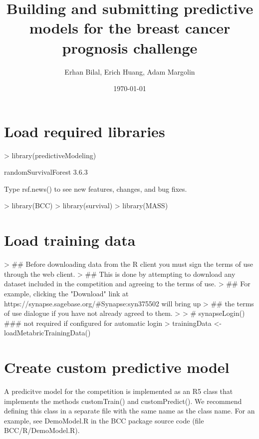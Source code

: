 \documentclass[10pt]{article}
\title{Building and submitting predictive models for the breast cancer prognosis challenge}
\author{Erhan Bilal, Erich Huang, Adam Margolin}
\date{\today}
\begin{document}


\maketitle

\section{Load required libraries}
\begin{Schunk}
\begin{Sinput}
> library(predictiveModeling)
\end{Sinput}
\begin{Soutput}
randomSurvivalForest 3.6.3

Type rsf.news() to see new features, changes, and bug fixes.
\end{Soutput}
\begin{Sinput}
> library(BCC)
> library(survival)
> library(MASS)
\end{Sinput}
\end{Schunk}

\section{Load training data}
\begin{Schunk}
\begin{Sinput}
> ## Before downloading data from the R client you must sign the terms of use through the web client.
> ## This is done by attempting to download any dataset included in the competition and agreeing to the terms of use.
> ## For example, clicking the "Download" link at https://synapse.sagebase.org/\#Synapse:syn375502 will bring up
> ## the terms of use dialogue if you have not already agreed to them.
> 
> # synapseLogin() ### not required if configured for automatic login
> trainingData <- loadMetabricTrainingData()
\end{Sinput}
\end{Schunk}

\section{Create custom predictive model}
A predicitve model for the competition is implemented as an R5 class that implements the methods customTrain() and customPredict(). We recommend defining this class in a separate file with the same name as the class name. For an example, see DemoModel.R in the BCC package source code (file BCC/R/DemoModel.R).
\end{document}
